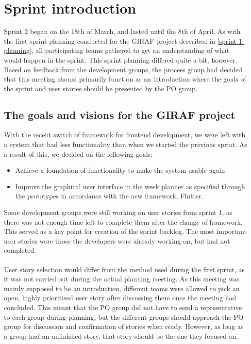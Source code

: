 \section{Sprint introduction}
Sprint 2 began on the 18th of March, and lasted until the 8th of April.
As with the first sprint planning conducted for the GIRAF project described in \autoref{sprint-1-planning}, all participating teams gathered to get an understanding of what would happen in the sprint.
This sprint planning differed quite a bit, however.
Based on feedback from the development groups, the process group had decided that this meeting should primarily function as an introduction where the goals of the sprint and user stories should be presented by the PO group.

\subsection{The goals and visions for the GIRAF project}
With the recent switch of framework for frontend development, we were left with a system that had less functionality than when we started the previous sprint.
As a result of this, we decided on the following goals:
\begin{itemize}
    \item Achieve a foundation of functionality to make the system usable again
    \item Improve the graphical user interface in the week planner as specified through the prototypes in accordance with the new framework, Flutter.
\end{itemize}
Some development groups were still working on user stories from sprint 1, as there was not enough time left to complete them after the change of framework.
This served as a key point for creation of the sprint backlog.
The most important user stories were those the developers were already working on, but had not completed. 
\\\\
User story selection would differ from the method used during the first sprint, as it was not carried out during the actual planning meeting.
As this meeting was mainly supposed to be an introduction, different teams were allowed to pick an open, highly prioritised user story after discussing them once the meeting had concluded.
This meant that the PO group did not have to send a representative to each group during planning, but the different groups should approach the PO group for discussion and confirmation of stories when ready.
However, as long as a group had an unfinished story, that story should be the one they focused on.
